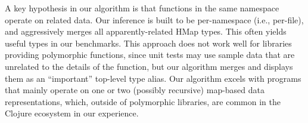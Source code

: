 \begin{figure}
\end{figure}



A key hypothesis in our algorithm is that functions in the same
namespace operate on related data. Our inference is built
to be per-namespace (i.e., per-file),
and aggressively merges all apparently-related HMap types.
This often yields useful types in our benchmarks.
This approach does not work well for libraries providing polymorphic
functions, since unit tests may use sample data that are unrelated
to the details of the function, but our algorithm merges and displays
them as an ``important'' top-level type alias.
Our algorithm excels
with programs that mainly operate on one or two (possibly recursive) map-based
data representations,
which, outside of polymorphic libraries, are common in the Clojure ecosystem
in our experience.

